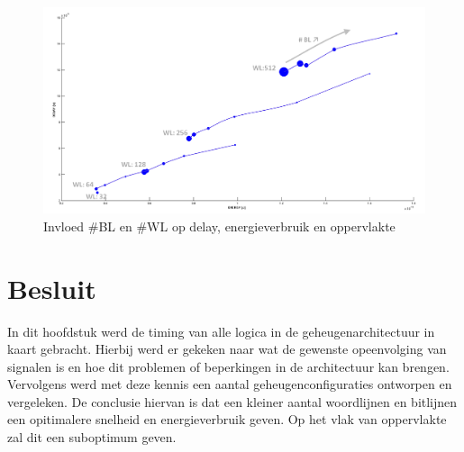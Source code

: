 \begin{figure}[!ht]
  \centering
  \includegraphics[scale=0.6]{../fig/hfdstk-timing-all-sol2.png}
  \caption{Invloed \#BL en \#WL op delay, energieverbruik en oppervlakte}
  \label{fig:final20all2}
\end{figure} 

\section{Besluit}
In dit hoofdstuk werd de timing van alle logica in de geheugenarchitectuur in kaart gebracht. Hierbij werd er gekeken naar wat de gewenste opeenvolging van signalen is en hoe dit problemen of beperkingen in de architectuur kan brengen. Vervolgens werd met deze kennis een aantal geheugenconfiguraties ontworpen en vergeleken. De conclusie hiervan is dat een kleiner aantal woordlijnen en bitlijnen een opitimalere snelheid en energieverbruik geven. Op het vlak van oppervlakte zal dit een suboptimum geven.
